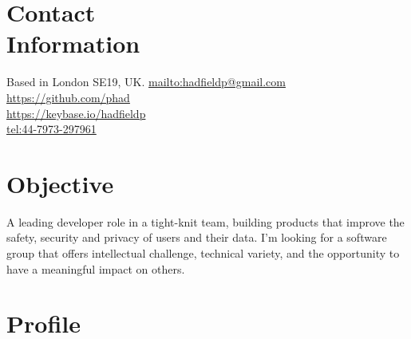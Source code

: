 \documentclass[line]{resume}
\begin{document}
\begin{resume}

    \section{\mysidestyle Contact\\Information}

    Based in London SE19, UK.              \hfill \url{mailto:hadfieldp@gmail.com}         \vspace{0mm}\\\vspace{0mm}%
                                           \hfill \url{https://github.com/phad}            \vspace{0mm}\\\vspace{0mm}%
                                           \hfill \url{https://keybase.io/hadfieldp}       \vspace{0mm}\\\vspace{0mm}%
                                           \hfill \url{tel:44-7973-297961}                 \vspace{0mm}\\\vspace{-4.5mm}%

    \section{\mysidestyle Objective}

    A leading developer role in a tight-knit team, building products that improve the safety, security and privacy of
    users and their data.  I'm looking for a software group that offers intellectual challenge, technical variety, and
    the opportunity to have a meaningful impact on others.

    \section{\mysidestyle Profile}


\end{resume}
\end{document}
